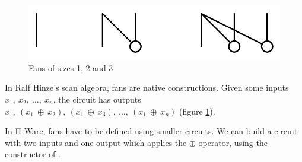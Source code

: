 \begin{figure}[ht]
\centering
\includegraphics[scale=0.25]{fans_123.pdf}
\caption{Fans of sizes 1, 2 and 3}
\label{fig:fans}
\end{figure}

In Ralf Hinze's scan algebra, fans are native constructions.
Given some inputs $x_1,\ x_2,\ \ldots{},\ x_n$, the circuit 
 has outputs $x_1,\ (x_1\ \oplus\ x_2),\ (x_1\ \oplus\ x_3),\
\ldots{},\ (x_1\ \oplus\ x_n)$ (figure \ref{fig:fans}).

In Π-Ware, fans have to be defined using smaller circuits.
We can build a  circuit with two inputs and one output which
applies the $\oplus$ operator, using the \AI{Gate} constructor of .

